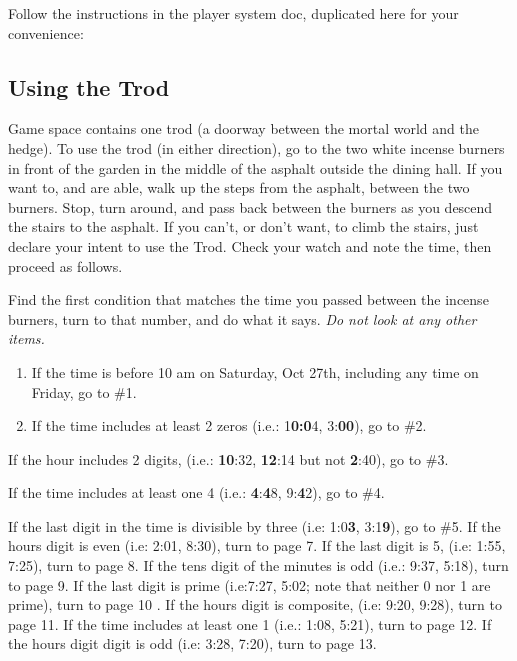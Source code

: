 \documentclass[green]{gl2018}
\begin{document}
\name{\gTrod{}}
\newcommand{\areastart}[1]{ \begin{huge}{\bf \#{#1}} \end{huge} \\}
\newenvironment{sect}[1]{\begin{minipage}{\textwidth}\areastart{#1}\\}{\end{minipage}\vspace{2in}}

Follow the instructions in the player system doc, duplicated here for your convenience:
\begin{addmargin}[0.5in]{0em}

\subsection*{Using the Trod}

Game space contains one trod (a doorway between the mortal world and the hedge). To use the trod (in either direction), go to the two white incense burners in front of the garden in the middle of the asphalt outside the dining hall. If you want to, and are able, walk up the steps from the asphalt, between the two burners. Stop, turn around, and pass back between the burners as you descend the stairs to the asphalt. If you can’t, or don’t want, to climb the stairs, just declare your intent to use the Trod. Check your watch and note the time, then proceed as follows.
\end{addmargin}
Find the first condition that matches the time you passed between the incense burners, turn to that number, and do what it says. {\em Do not look at any other items.}
\begin{enumerate}
\item If the time is before 10 am on Saturday, Oct 27th, including any time on Friday, go to \#1.
\item 
If the time includes at least 2 zeros (i.e.: 1\textbf{0:0}4, 3:\textbf{00}), go to \#2.
\end{enumerate}
\item If the hour includes 2 digits, (i.e.: \textbf{10}:32, \textbf{12}:14 but not \textbf{2}:40), go to \#3.
\item 
If the time includes at least one 4 (i.e.: \textbf{4}:\textbf{4}8, 9:\textbf{4}2), go to \#4.
\item 
If the last digit in the time is divisible by three (i.e: 1:0\textbf{3}, 3:1\textbf{9}), go to \#5.
If the hours digit is even (i.e: 2:01, 8:30), turn to page 7.
If the last digit is 5, (i.e: 1:55, 7:25), turn to page 8. 
If the tens digit of the minutes is odd (i.e.: 9:37, 5:18), turn to page 9.
If the last digit is prime (i.e:7:27, 5:02; note that neither 0 nor 1 are prime), turn to page 10 .
If the hours digit is composite, (i.e: 9:20, 9:28), turn to page 11.
If the time includes at least one 1 (i.e.: 1:08, 5:21), turn to page 12.
If the hours digit digit is odd (i.e: 3:28, 7:20), turn to page 13.

\pagebreak
\end{document}
